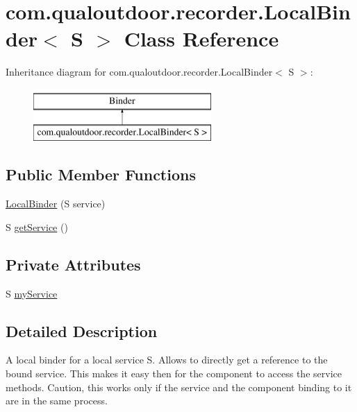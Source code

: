 \hypertarget{classcom_1_1qualoutdoor_1_1recorder_1_1LocalBinder_3_01S_01_4}{\section{com.\-qualoutdoor.\-recorder.\-Local\-Binder$<$ S $>$ Class Reference}
\label{classcom_1_1qualoutdoor_1_1recorder_1_1LocalBinder_3_01S_01_4}
}
Inheritance diagram for com.\-qualoutdoor.\-recorder.\-Local\-Binder$<$ S $>$\-:\begin{figure}[H]
\begin{center}
\leavevmode
\includegraphics[height=2.000000cm]{classcom_1_1qualoutdoor_1_1recorder_1_1LocalBinder_3_01S_01_4}
\end{center}
\end{figure}
\subsection*{Public Member Functions}
\begin{DoxyCompactItemize}
\item 
\hyperlink{classcom_1_1qualoutdoor_1_1recorder_1_1LocalBinder_3_01S_01_4_ab48e226df4e040a1cac760c348bcc3c6}{Local\-Binder} (S service)
\item 
S \hyperlink{classcom_1_1qualoutdoor_1_1recorder_1_1LocalBinder_3_01S_01_4_aed7f31eb91a277b6d7e583926456f094}{get\-Service} ()
\end{DoxyCompactItemize}
\subsection*{Private Attributes}
\begin{DoxyCompactItemize}
\item 
S \hyperlink{classcom_1_1qualoutdoor_1_1recorder_1_1LocalBinder_3_01S_01_4_ac5ec5cb26b7312783a045d98fe2842c4}{my\-Service}
\end{DoxyCompactItemize}


\subsection{Detailed Description}
A local binder for a local service S. Allows to directly get a reference to the bound service. This makes it easy then for the component to access the service methods. Caution, this works only if the service and the component binding to it are in the same process.

